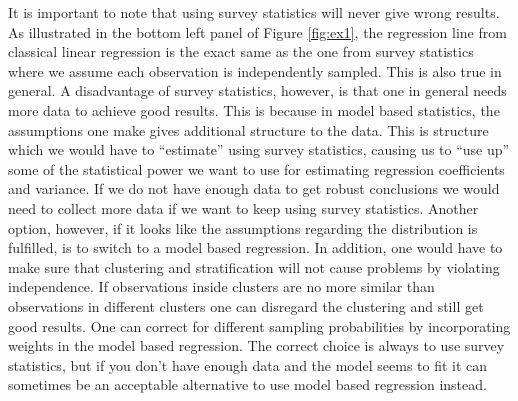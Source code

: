 \documentclass{article}
\begin{document}
%
%
%
%
%

It is important to note that using survey statistics will never give wrong
results. As illustrated in the bottom left panel of Figure \ref{fig:ex1}, the
regression line from classical linear regression is the exact same as the one
from survey statistics where we assume each observation is independently sampled.
This is also true in general. A disadvantage of survey statistics, however, is
that one in general needs more data to achieve good results. This is because in
model based statistics, the assumptions one make gives additional structure to
the data. This is structure which we would have to ``estimate'' using survey
statistics, causing us to ``use up'' some of the statistical power we want to
use for estimating regression coefficients and variance. If we do not have enough
data to get robust conclusions we would need to collect more data if we want
to keep using survey statistics. Another option, however, if it looks like the
assumptions regarding the distribution is  fulfilled, is to switch to
a model based regression. In addition, one would have to make sure that
clustering and stratification will not cause problems by violating independence.
If observations inside clusters are no more similar than observations in
different clusters one can disregard the clustering and still get good results.
One can correct for different sampling probabilities by incorporating weights in
the model based regression.
The correct choice is always to use survey statistics, but if you don't have
enough data and the model seems to fit it can sometimes be an acceptable
alternative to use model based regression instead.
\end{document}
